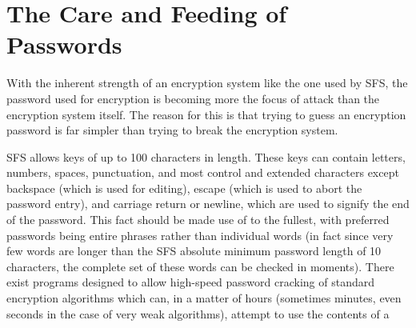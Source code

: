 
%

\section{The Care and Feeding of Passwords}

With the inherent strength of an encryption system like the one used by SFS,
the password used for encryption is becoming more the focus of attack than the
encryption system itself.  The reason for this is that trying to guess an
encryption password is far simpler than trying to break the encryption system.

SFS allows keys of up to 100 characters in length.  These keys can contain
letters, numbers, spaces, punctuation, and most control and extended characters
except backspace (which is used for editing), escape (which is used to abort
the password entry), and carriage return or newline, which are used to signify
the end of the password.  This fact should be made use of to the fullest, with
preferred passwords being entire phrases rather than individual words (in fact
since very few words are longer than the SFS absolute minimum password length
of 10 characters, the complete set of these words can be checked in moments).
There exist programs designed to allow high-speed password cracking of standard
encryption algorithms which can, in a matter of hours (sometimes minutes, even
seconds in the case of very weak algorithms), attempt to use the contents of a
